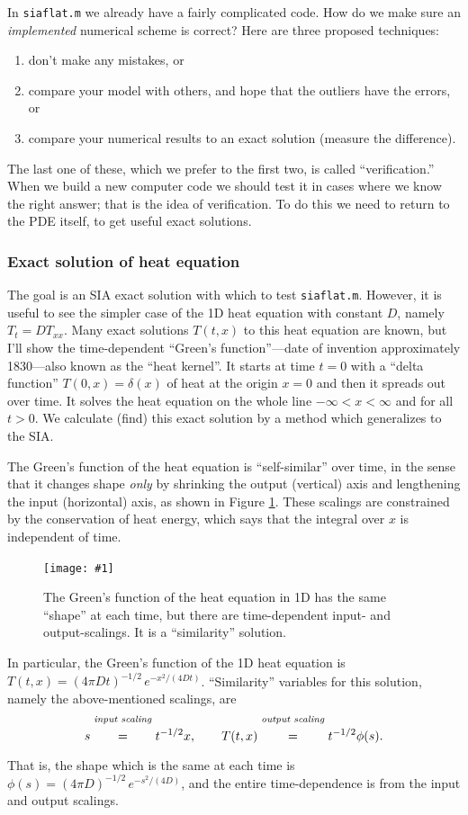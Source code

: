 \documentclass[titlepage,letterpaper,final,12pt]{scrartcl}
\newcommand{\onefigsize}[3]{
\begin{figure}[ht]
\centering
\texttt{[image: \#1]}
\caption{#2}
\label{fig:#1}
\end{figure}}
\begin{document}
In \texttt{siaflat.m} we already have a fairly complicated code.  How do we make sure an \emph{implemented} numerical scheme is correct?  Here are three proposed techniques:
\begin{enumerate}
  \item don't make any mistakes, or
  \item compare your model with others, and hope that the outliers have the errors, or
  \item compare your numerical results to an exact solution (measure the difference).   \end{enumerate}
The last one of these, which we prefer to the first two, is called ``verification.''  When we build a new computer code we should test it in cases where we know the right answer; that is the idea of verification.  To do this we need to return to the PDE itself, to get useful exact solutions.

\subsubsection*{Exact solution of heat equation}  The goal is an SIA exact solution with which to test \texttt{siaflat.m}.  However, it is useful to see the simpler case of the 1D heat equation with constant $D$, namely $T_t = D T_{xx}$.  Many exact solutions $T(t,x)$ to this heat equation are known, but I'll show the time-dependent ``Green's function''---date of invention approximately 1830---also known as the ``heat kernel''.  It starts at time $t=0$ with a ``delta function'' $T(0,x)=\delta(x)$ of heat at the origin $x=0$ and then it spreads out over time.  It solves the heat equation on the whole line $-\infty<x<\infty$ and for all $t>0$.  We calculate (find) this exact solution by a method which generalizes to the SIA.

The Green's function of the heat equation is ``self-similar'' over time, in the sense that it changes shape \emph{only} by shrinking the output (vertical) axis and lengthening the input (horizontal) axis, as shown in Figure \ref{fig:heatscaling}.  These scalings are constrained by the conservation of heat energy, which says that the integral over $x$ is independent of time.

\onefigsize{heatscaling}{The Green's function of the heat equation in 1D has the same ``shape'' at each time, but there are time-dependent input- and output-scalings.  It is a ``similarity'' solution.}{2.4in}

In particular, the Green's function of the 1D heat equation is $T(t,x) = (4 \pi D t)^{-1/2}\, e^{-x^2/(4Dt)}$.  ``Similarity'' variables for this solution, namely the above-mentioned scalings, are
	$$s \stackrel{\text{\emph{input scaling}}}{\phantom{\Big|}=\phantom{\Big|}} t^{-1/2} x, \qquad T(t,x) \stackrel{\text{\emph{output scaling}}}{\phantom{\Big|}=\phantom{\Big|}} t^{-1/2} \phi(s).$$
That is, the shape which is the same at each time is $\phi(s) = (4 \pi D)^{-1/2}\, e^{-s^2/(4D)}$, and the entire time-dependence is from the input and output scalings.
\end{document}
